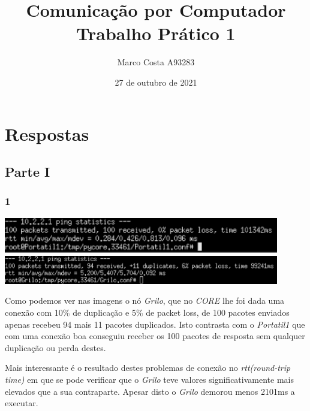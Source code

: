 \documentclass{article}
\title{
    Comunicação por Computador \\
    \large{Trabalho Prático 1}
}
\author{
    Marco Costa A93283
}
\date{27 de outubro de 2021}
\affil{
    Universidade do Minho
}
\begin{document}
        \maketitle
    \section*{Respostas}
        \subsection*{Parte I}
            \subsubsection*{1}
                {
                    \centering
                    \includegraphics[width=12cm]{images/ping-portatil.png}
                    \includegraphics[width=12cm]{images/ping-grilo.png}
                    \par
                }
                    Como podemos ver nas imagens o nó \textit{Grilo}, que no \textit{CORE} lhe foi dada
                uma conexão com 10\% de duplicação e 5\% de packet loss, de 100 pacotes enviados apenas recebeu
                94 mais 11 pacotes duplicados. Isto contrasta com o \textit{Portatil1} que com uma conexão boa conseguiu
                receber os 100 pacotes de resposta sem qualquer duplicação ou perda destes.\par

                    Mais interessante é o resultado destes problemas de conexão no \textit{rtt(round-trip time)} em que se pode verificar
                que o \textit{Grilo} teve valores significativamente mais elevados que a sua contraparte. Apesar disto o \textit{Grilo} demorou
                menos 2101ms a executar.
\end{document}
